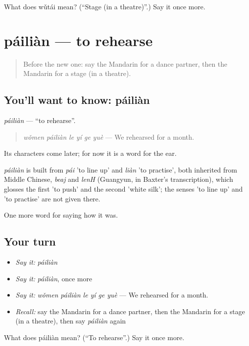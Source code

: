 \begin{tcolorbox}[breakable,colback=teal!4,colframe=teal!35!black,title={Before you move on}]
What does wǔtái mean? (\textquotedblleft{}Stage (in a theatre)\textquotedblright{}.) Say it once more.
\end{tcolorbox}
\section[páiliàn]{páiliàn — to rehearse}

\label{lesson:ZH-C505-pailian}



\begin{quote}
Before the new one: say the Mandarin for a dance partner, then the Mandarin for a stage (in a theatre).
\end{quote}

\subsection*{You'll want to know: páiliàn}
\emph{páiliàn} — \textquotedblleft{}to rehearse\textquotedblright{}.

\begin{quote}
\emph{wǒmen páiliàn le yí ge yuè} — We rehearsed for a month.
\end{quote}

Its characters come later; for now it is a word for the ear.

\begin{cousinweb}
\emph{páiliàn} is built from \emph{pái} 'to line up' and \emph{liàn} 'to practise', both inherited from Middle Chinese, \emph{beaj} and \emph{lenH} (Guangyun, in Baxter's transcription), which glosses the first 'to push' and the second 'white silk'; the senses 'to line up' and 'to practise' are not given there.
\end{cousinweb}

\begin{grammarlens}[title={What you've built}]
One more word for saying how it was.
\end{grammarlens}

\subsection*{Your turn}
\begin{itemize}
\raggedright
  \item \emph{Say it:} \emph{páiliàn}
  \item \emph{Say it:} \emph{páiliàn}, once more
  \item \emph{Say it:} \emph{wǒmen páiliàn le yí ge yuè} — We rehearsed for a month.
  \item \emph{Recall:} say the Mandarin for a dance partner, then the Mandarin for a stage (in a theatre), then say \emph{páiliàn} again
\end{itemize}

\begin{tcolorbox}[breakable,colback=teal!4,colframe=teal!35!black,title={Before you move on}]
What does páiliàn mean? (\textquotedblleft{}To rehearse\textquotedblright{}.) Say it once more.
\end{tcolorbox}
